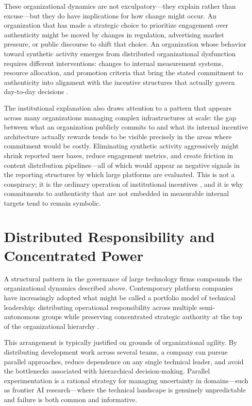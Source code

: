 \documentclass[12pt,a4paper]{article}
\begin{document}
These organizational dynamics are not exculpatory---they explain rather than excuse---but they
do have implications for how change might occur. An organization that has made a strategic choice
to prioritize engagement over authenticity might be moved by changes in regulation, advertising
market pressure, or public discourse to shift that choice. An organization whose behavior toward
synthetic activity emerges from distributed organizational dysfunction requires different
interventions: changes to internal measurement systems, resource allocation, and promotion
criteria that bring the stated commitment to authenticity into alignment with the incentive
structures that actually govern day-to-day decisions \citep{noble2018,zuboff2019}.

The institutional explanation also draws attention to a pattern that appears across many
organizations managing complex infrastructures at scale: the gap between what an organization
publicly commits to and what its internal incentive architecture actually rewards tends to be
visible precisely in the areas where commitment would be costly. Eliminating synthetic activity
aggressively might shrink reported user bases, reduce engagement metrics, and create friction
in content distribution pipelines---all of which would appear as negative signals in the
reporting structures by which large platforms are evaluated. This is not a conspiracy; it is
the ordinary operation of institutional incentives \citep{strathern1997}, and it is why
commitments to authenticity that are not embedded in measurable internal targets tend to
remain symbolic.

\section{Distributed Responsibility and Concentrated Power}

A structural pattern in the governance of large technology firms compounds the organizational
dynamics described above. Contemporary platform companies have increasingly adopted what might
be called a portfolio model of technical leadership: distributing operational responsibility
across multiple semi-autonomous groups while preserving concentrated strategic authority at
the top of the organizational hierarchy \citep{gillespie2018}.

This arrangement is typically justified on grounds of organizational agility. By distributing
development work across several teams, a company can pursue parallel approaches, reduce
dependence on any single technical leader, and avoid the bottlenecks associated with hierarchical
decision-making. Parallel experimentation is a rational strategy for managing uncertainty in
domains---such as frontier AI research---where the technical landscape is genuinely unpredictable
and failure is both common and informative.
\end{document}

